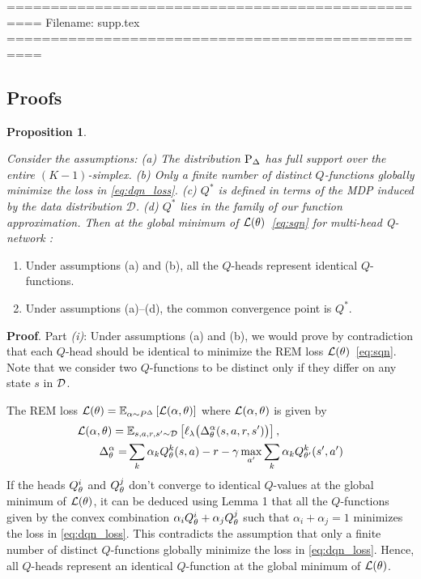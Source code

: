 ==================================================
Filename: supp.tex
==================================================

\subsection{Proofs}

\textbf{Proposition 1}.
{\it
Consider the assumptions:
(a) The distribution ${\textnormal{P}}_{\Delta}$ has full support over the entire $(K-1)$-simplex.
(b) Only a finite number of distinct $Q$-functions globally minimize the loss in \eqref{eq:dqn_loss}.
(c) $Q^*$ is defined in terms of the MDP induced by the data distribution $\mathcal{D}$.
(d) $Q^*$ lies in the family of our function approximation.
Then at the global minimum of $\mathcal{L}({\theta})$~\eqref{eq:sqn} for multi-head Q-network :
\begin{enumerate}[label=(\roman*)]
\itemsep0.15em
\item Under assumptions (a) and (b), all the $Q$-heads represent identical $Q$-functions.
\item Under assumptions (a)--(d), the common convergence point is $Q^*$.
\end{enumerate}
}

\textbf{Proof}. Part \textit{(i)}:
Under assumptions (a) and (b), we would prove by contradiction
that each $Q$-head should be identical to minimize the REM loss
$\mathcal{L}({\theta})$~\eqref{eq:sqn}.
Note that we consider two $Q$-functions to be distinct only if they differ on any
state $s$ in $\mathcal{D}$.

The REM loss $\mathcal{L}({\theta}) = \mathbb{E}_{\alpha \sim P^{\Delta}} \left[\mathcal{L}(\alpha, \theta)\right]$
where $\mathcal{L}(\alpha, \theta)$ is given by
\begin{align}\label{eq:loss_alpha_theta}
\mathcal{L}(\alpha, \theta) ={}& \mathbb{E}_{s, a, r, s' \sim \mathcal{D}} \left[ \ell_{\lambda} \big( \Delta^{\alpha}_{\theta}(s, a, r, s')
 \big) \right], \\
\Delta^{\alpha}_{\theta} =& \sum_{k} \alpha_{k} Q_{\theta}^{k}(s, a) - r - \gamma\max_{a'} \sum_{k} \alpha_{k}Q_{\theta^{\prime}}^{k}(s', a') \nonumber
\end{align}
If the heads $Q_{\theta}^{i}$ and $Q_{\theta}^{j}$ don't converge to identical $Q$-values at the global minimum
of $\mathcal{L}({\theta})$, it can be deduced using Lemma 1 that all the $Q$-functions given by the convex combination
$\alpha_i Q_{\theta}^{i} + \alpha_j Q_{\theta}^{j}$ such that $\alpha_i + \alpha_j = 1$ minimizes the loss in \eqref{eq:dqn_loss}.
This contradicts the assumption that only a finite number of distinct $Q$-functions globally minimize the
loss in \eqref{eq:dqn_loss}. Hence, all $Q$-heads represent an identical $Q$-function at the
global minimum of $\mathcal{L}({\theta})$.

